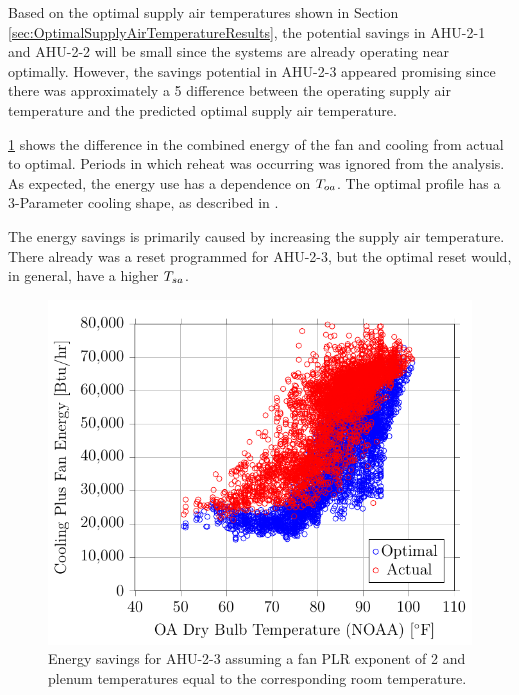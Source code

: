 Based on the optimal supply air temperatures shown in Section
\ref{sec:OptimalSupplyAirTemperatureResults}, the potential savings in
AHU-2-1 and AHU-2-2 will be small since the systems are already
operating near optimally. However, the savings potential in AHU-2-3
appeared promising since there was approximately a \SI{5}{\degreeF}
difference between the operating supply air temperature and the
predicted optimal supply air temperature. 

\figref{}
\ref{fig:2017-01-24-1607-VariableTotalPowervsOADryBulbTemperatureNOAA}
shows the difference in the combined energy of the fan and cooling from
actual to optimal. Periods in which reheat was occurring was ignored
from the analysis. As expected, the energy use has a dependence on
\(T_{oa}\). The optimal profile has a 3-Parameter cooling shape, as
described in \cite{ASHRAE2014}. 

The energy savings is primarily caused by increasing the supply air
temperature. There already was a reset programmed for AHU-2-3, but the
optimal reset would, in general, have a higher \(T_{sa}\). 


\begin{figure}
\centering
\includegraphics[]{Plots/2017-01-24-1607-VariableTotalPowervsOADryBulbTemperatureNOAA.pdf}
\caption{Energy savings for AHU-2-3 assuming a fan PLR exponent of 2 and plenum temperatures equal to the corresponding room temperature.}
\label{fig:2017-01-24-1607-VariableTotalPowervsOADryBulbTemperatureNOAA}
\end{figure}

